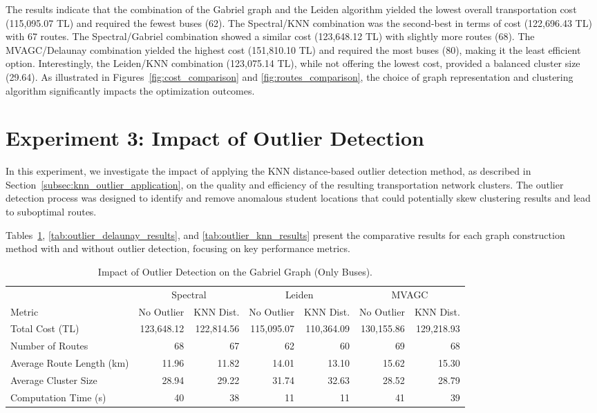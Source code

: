 The results indicate that the combination of the Gabriel graph and the Leiden algorithm yielded the lowest overall transportation cost (115,095.07 TL) and required the fewest buses (62). The Spectral/KNN combination was the second-best in terms of cost (122,696.43 TL) with 67 routes. The Spectral/Gabriel combination showed a similar cost (123,648.12 TL) with slightly more routes (68). The MVAGC/Delaunay combination yielded the highest cost (151,810.10 TL) and required the most buses (80), making it the least efficient option. Interestingly, the Leiden/KNN combination (123,075.14 TL), while not offering the lowest cost, provided a balanced cluster size (29.64). As illustrated in Figures~\ref{fig:cost_comparison} and \ref{fig:routes_comparison}, the choice of graph representation and clustering algorithm significantly impacts the optimization outcomes.

\section{Experiment 3: Impact of Outlier Detection}
\label{sec:exp_outlier}

In this experiment, we investigate the impact of applying the KNN distance-based outlier detection method, as described in Section~\ref{subsec:knn_outlier_application}, on the quality and efficiency of the resulting transportation network clusters. The outlier detection process was designed to identify and remove anomalous student locations that could potentially skew clustering results and lead to suboptimal routes.


Tables~\ref{tab:outlier_gabriel_results}, \ref{tab:outlier_delaunay_results}, and \ref{tab:outlier_knn_results} present the comparative results for each graph construction method with and without outlier detection, focusing on key performance metrics.

\begin{table}[h]
\centering
\scriptsize{
\setlength{\tabcolsep}{4pt}
\begin{tabular}{lrrrrrr}
\toprule
& \multicolumn{2}{c}{Spectral} & \multicolumn{2}{c}{Leiden} & \multicolumn{2}{c}{MVAGC} \\
\cmidrule(lr){2-3} \cmidrule(lr){4-5} \cmidrule(lr){6-7}
Metric & No Outlier & KNN Dist. & No Outlier & KNN Dist. & No Outlier & KNN Dist. \\
\midrule
Total Cost (TL) & 123,648.12 & 122,814.56 & 115,095.07 & 110,364.09 & 130,155.86 & 129,218.93 \\
Number of Routes & 68 & 67 & 62 & 60 & 69 & 68 \\
Average Route Length (km) & 11.96 & 11.82 & 14.01 & 13.10 & 15.62 & 15.30 \\
Average Cluster Size & 28.94 & 29.22 & 31.74 & 32.63 & 28.52 & 28.79 \\
Computation Time (s) & 40 & 38 & 11 & 11 & 41 & 39 \\ 
\bottomrule
\end{tabular}
}
\caption{Impact of Outlier Detection on the Gabriel Graph (Only Buses).}
\label{tab:outlier_gabriel_results}
\end{table}

